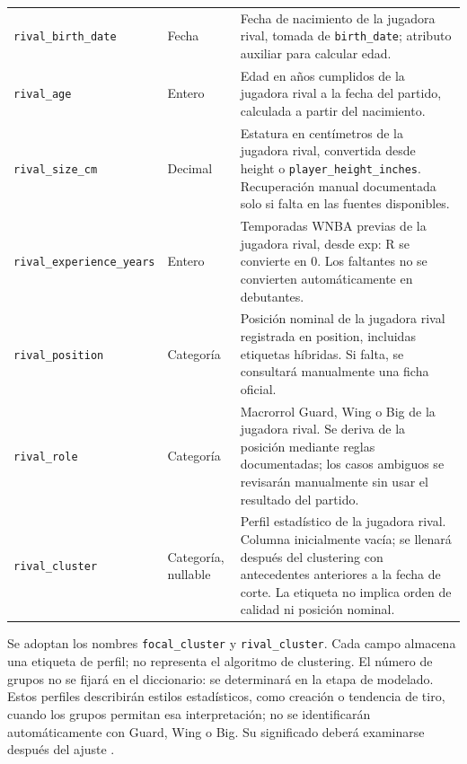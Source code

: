 \begin{longtable}{@{}>{\raggedright\arraybackslash}p{5.0cm}>{\raggedright\arraybackslash}p{1.9cm}>{\raggedright\arraybackslash}p{7.7cm}@{}}
\texttt{rival\_\allowbreak birth\_\allowbreak date} & Fecha & Fecha de nacimiento de la jugadora rival, tomada de \texttt{birth\_\allowbreak date}; atributo auxiliar para calcular edad.\\
\texttt{rival\_\allowbreak age} & Entero & Edad en años cumplidos de la jugadora rival a la fecha del partido, calculada a partir del nacimiento.\\
\texttt{rival\_\allowbreak size\_\allowbreak cm} & Decimal & Estatura en centímetros de la jugadora rival, convertida desde height o \texttt{player\_\allowbreak height\_\allowbreak inches}. Recuperación manual documentada solo si falta en las fuentes disponibles.\\
\texttt{rival\_\allowbreak experience\_\allowbreak years} & Entero & Temporadas WNBA previas de la jugadora rival, desde exp: R se convierte en 0. Los faltantes no se convierten automáticamente en debutantes.\\
\texttt{rival\_\allowbreak position} & Categoría & Posición nominal de la jugadora rival registrada en position, incluidas etiquetas híbridas. Si falta, se consultará manualmente una ficha oficial.\\
\texttt{rival\_\allowbreak role} & Categoría & Macrorrol Guard, Wing o Big de la jugadora rival. Se deriva de la posición mediante reglas documentadas; los casos ambiguos se revisarán manualmente sin usar el resultado del partido.\\
\texttt{rival\_\allowbreak cluster} & Categoría, nullable & Perfil estadístico de la jugadora rival. Columna inicialmente vacía; se llenará después del clustering con antecedentes anteriores a la fecha de corte. La etiqueta no implica orden de calidad ni posición nominal.\\
\end{longtable}
\endgroup
Se adoptan los nombres \texttt{focal\_cluster} y \texttt{rival\_cluster}. Cada campo almacena una etiqueta de perfil; no representa el algoritmo de clustering. El número de grupos no se fijará en el diccionario: se determinará en la etapa de modelado. Estos perfiles describirán estilos estadísticos, como creación o tendencia de tiro, cuando los grupos permitan esa interpretación; no se identificarán automáticamente con Guard, Wing o Big. Su significado deberá examinarse después del ajuste \cite{yamada2024offensivelineupanalysisbasketball}.

